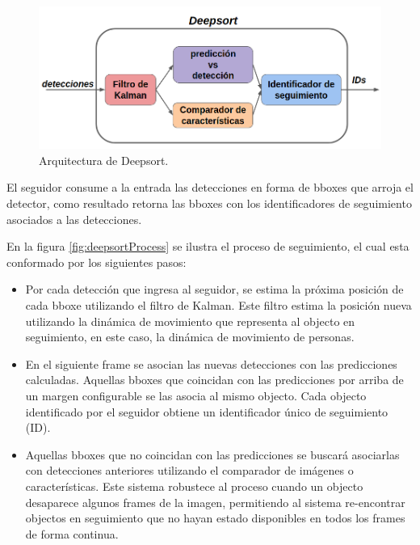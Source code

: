 \begin{figure}[ht]
	\centering
	\includegraphics[scale=.55]{./Figures/deepsort.png}
	\caption{Arquitectura de Deepsort.}
	\label{fig:deepsortArq}
\end{figure}

El seguidor consume a la entrada las detecciones en forma de bboxes que arroja el detector, como resultado retorna las bboxes con los identificadores de seguimiento asociados a las detecciones.

\newpage

En la figura \ref{fig:deepsortProcess} se ilustra el proceso de seguimiento, el cual esta conformado por los siguientes pasos:
\begin{itemize}
\item Por cada detección que ingresa al seguidor, se estima la próxima posición de cada bboxe utilizando el filtro de Kalman. Este filtro estima la posición nueva utilizando la dinámica de movimiento que representa al objecto en seguimiento, en este caso, la dinámica de movimiento de personas.
\item En el siguiente frame se asocian las nuevas detecciones con las predicciones calculadas. Aquellas bboxes que coincidan con las predicciones por arriba de un margen configurable se las asocia al mismo objecto. Cada objecto identificado por el seguidor obtiene un identificador único de seguimiento (ID).
\item Aquellas bboxes que no coincidan con las predicciones se buscará asociarlas con detecciones anteriores utilizando el comparador de imágenes o características. Este sistema robustece al proceso cuando un objecto desaparece algunos frames de la imagen, permitiendo al sistema re-encontrar objectos en seguimiento que no hayan estado disponibles en todos los frames de forma continua.
\end{itemize}

